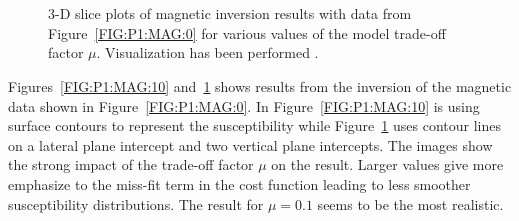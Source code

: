 \begin{figure}
    \begin{center}
        \\ %
        \\ %
    \end{center}
    \caption{3-D slice plots of magnetic inversion results with data from
    Figure~\ref{FIG:P1:MAG:0} for various values of the model trade-off
    factor $\mu$. Visualization has been performed \VisIt.}
    \label{FIG:P1:MAG:11}
\end{figure}

Figures~\ref{FIG:P1:MAG:10} and~\ref{FIG:P1:MAG:11} shows results from
the inversion of the magnetic data shown in Figure~\ref{FIG:P1:MAG:0}.
In Figure~\ref{FIG:P1:MAG:10} is using surface contours to represent the 
susceptibility while Figure~\ref{FIG:P1:MAG:11} uses contour lines
on a lateral plane intercept and two vertical plane intercepts. 
The images show the strong impact of the trade-off factor $\mu$
on the result. Larger values give more emphasize to the miss-fit term 
in the cost function leading to less smoother susceptibility distributions.
The result for $\mu=0.1$ seems to be the most realistic.







